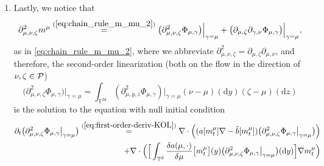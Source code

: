 \begin{enumerate}
\begin{equation}
\begin{split}
\end{split}
\end{equation}
where the forcing term is given by 
\begin{align*}
\mcl{J}(\nu - \gamma, \zeta - \mu) \overset{(\ref{eq:first_lin_Phi_initial})}{=} \Big(\int_{\mathbb{T}^d}\frac{\delta a(\cdot, \mu)}{\delta \mu}[m^{\mu}](y) \mathrm{d}(\partial_{\mu,\zeta} m^{\mu})(y)\Big) \nabla P_{0,\cdot}^{\mu}(\nu - \gamma)\\
- \Big(\int_{\mathbb{T}^d}\frac{\delta \tilde{b}(\cdot, \mu)}{\delta \mu}[m^{\mu}](y) \mathrm{d}(\partial_{\mu,\zeta} m^{\mu})(y)\Big) P_{0,\cdot}^{\mu}(\nu - \gamma).
\end{align*}
We then derive (\ref{eq:I1}) from (\ref{eq:I_mu_nu_epsilon_lin}) by identifying 
\[
I^{\mu,1}(\nu - \mu, \zeta - \mu) = \big(\partial_{\mu, \zeta} \partial_{\gamma,\nu} \Phi_{\mu,\gamma}\big)\Big|_{\gamma = \mu}. 
\]
\item Lastly, we notice that 
\begin{equation}\label{eq:second_lin_m^mu}
\partial^2_{\mu,\nu,\zeta} m^{\mu} \overset{(\ref{eq:chain_rule_m_mu_2})}{=} \big(\partial_{\mu,\nu,\zeta}^2 \Phi_{\mu,\gamma}\big)\Big|_{\gamma = \mu} + \big(\partial_{\mu, \zeta} \partial_{\gamma,\nu} \Phi_{\mu,\gamma}\big)\Big|_{\gamma = \mu},
\end{equation}
as in \ref{eq:chain_rule_m_mu_2}, where we abbreviate $\partial^2_{\mu,\nu,\zeta} = \partial_{\mu,\zeta}\partial_{\mu,\nu}$, and therefore, the second-order linearization (both on the flow in the direction of $\nu, \zeta \in \mathcal{P}$) 
\[
\big(\partial^2_{\mu,\nu,\zeta} \Phi_{\mu,\gamma}\big)\Big|_{\gamma = \mu} = \int_{\mathbb{T}^{2d}}(\partial^2_{\mu,y,z} \Phi_{\mu,\gamma})\Big|_{\gamma = \mu} (\nu - \mu)(\mathrm{d}y)(\zeta - \mu)(\mathrm{d}z) 
\]
is the solution to the equation with null initial condition
\begin{equation}\label{eq:2nd_linear_decouple_equ}
\begin{split}
\partial_t \big(\partial^2_{\mu,\nu,\zeta} \Phi_{\mu,\gamma}\big|_{\gamma = \mu}\big) \overset{(\ref{eq:first-order-deriv-KOL})}{=}  \nabla \cdot \Big( (a[m_t^{\mu}] \nabla  - \tilde{b}[m_t^{\mu}]) \big(\partial^2_{\mu,\nu,\zeta} \Phi_{\mu,\gamma}\big|_{\gamma = \mu}\big)\Big) \\
 + \nabla \cdot \Big( \Big[ \int_{\mathbb{T}^d} \frac{\delta a(\mu, \cdot)}{\delta\mu}\big[m_t^{\mu}\big](y)\big(\partial^2_{\mu,\nu,\zeta} \Phi_{\mu,\gamma}\big|_{\gamma = \mu}\big)(\mathrm{d}y)\Big]  \nabla m_t^{\mu}\Big)\\

\end{split}
\end{equation}
\end{enumerate}
